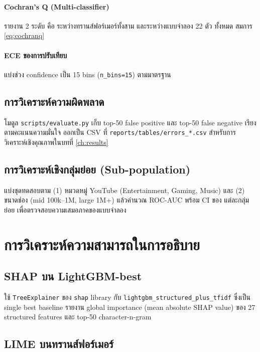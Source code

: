 \paragraph{Cochran's Q (Multi-classifier)}
รายงาน 2 ระดับ คือ ระหว่างทรานส์ฟอร์เมอร์ทั้งสาม และระหว่างแบบจำลอง 22 ตัว
ทั้งหมด สมการ \eqref{eq:cochranq}

\paragraph{ECE ของการปรับเทียบ}
แบ่งช่วง confidence เป็น 15 bins (\texttt{n\_bins=15}) ตามมาตรฐาน \textcite{naeini2015obtaining}

\subsection{การวิเคราะห์ความผิดพลาด}

โมดูล \texttt{scripts/evaluate.py} เก็บ top-50 false positive และ top-50
false negative เรียงตามคะแนนความมั่นใจ ออกเป็น CSV ที่ \texttt{reports/tables/errors\_*.csv}
สำหรับการวิเคราะห์เชิงคุณภาพในบทที่ \ref{ch:results}

\subsection{การวิเคราะห์เชิงกลุ่มย่อย (Sub-population)}

แบ่งชุดทดสอบตาม (1) หมวดหมู่ YouTube (Entertainment, Gaming, Music) และ
(2) ขนาดช่อง (mid 100k--1M, large 1M+) แล้วคำนวณ ROC-AUC พร้อม CI ของ
แต่ละกลุ่มย่อย เพื่อตรวจสอบความเสมอภาคของแบบจำลอง

\section{การวิเคราะห์ความสามารถในการอธิบาย}
\label{sec:method-xai}

\subsection{SHAP บน LightGBM-best}

ใช้ \texttt{TreeExplainer} ของ \texttt{shap} library กับ
\texttt{lightgbm\_structured\_plus\_tfidf} ซึ่งเป็น single best baseline
รายงาน global importance (mean absolute SHAP value) ของ 27 structured
features และ top-50 character-n-gram

\subsection{LIME บนทรานส์ฟอร์เมอร์}

